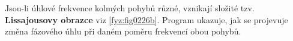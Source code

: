       Jsou-li úhlové frekvence kolmých pohybů různé, vznikají složité tzv. \textbf{Lissajousovy 
      obrazce} viz \ref{fyz:fig0226b}. Program ukazuje, jak se projevuje změna fázového 
      úhlu při daném poměru frekvencí obou pohybů.
      
      

